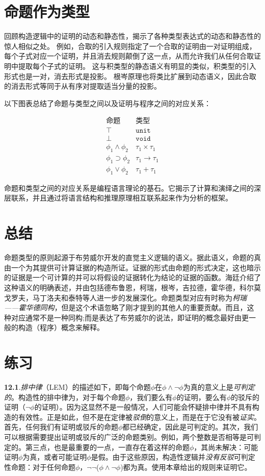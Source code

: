 \section{命题作为类型}

回顾构造逻辑中的证明的动态和静态性，揭示了各种类型表达式的动态和静态性的惊人相似之处。
例如，合取的引入规则指定了一个合取的证明由一对证明组成，每个子式对应一个证明，并且消去规则颠倒了这一点，从而允许我们从任何合取证明中提取每个子式的证明。
这与积类型的静态语义有明显的类似，积类型的引入形式也是一对，消去形式是投影。
根岑原理也将类比扩展到动态语义，因此合取的消去形式等同于从有序对提取适当分量的投影。

以下图表总结了命题与类型之间以及证明与程序之间的对应关系：

$$
\begin{array}{ll}
\text{命题}           & \text{类型}            \\
\top                  & \mathtt{unit}          \\
\bot                  & \mathtt{void}          \\
\phi_1 \land \phi_2   & \tau_1 \times \tau_1   \\
\phi_1 \supset \phi_2 & \tau_1 \to \tau_1      \\
\phi_1 \lor \phi_2    & \tau_1 + \tau_1
\end{array}
$$

命题和类型之间的对应关系是编程语言理论的基石。它揭示了计算和演绎之间的深层联系，并且通过将语言结构和推理原理相互联系起来作为分析的框架。
\section{总结}
命题类型的原则起源于布劳威尔开发的直觉主义逻辑的语义。据此语义，命题的真由一个为其提供可计算证据的构造所证。证据的形式由命题的形式决定，这也暗示的证据是一个可计算的并可以将假设的证据转化为结论的证据的函数。海廷介绍了这种语义的明确表述，并由包括德布鲁恩，柯瑞，根岑，吉拉德，霍华德，科尔莫戈罗夫，马丁洛夫和泰特等人进一步的发展深化。命题类型对应有时称为\textit{柯瑞——霍华德同构}，但是这个术语忽略了刚才提到的其他人的重要贡献。而且，这种对应通常不是一种同构;而是表达了布劳威尔的说法，即证明的概念最好由更一般的构造（程序）概念来解释。

\section*{练习}
\textbf{12.1}.\textit{排中律}（LEM）的描述如下，即每个命题${\phi}$在${\phi \land \lnot\phi}$为真的意义上是\textit{可判定的}。构造性的排中律为，对于每个命题${\phi}$，我们要么有${\phi}$的证明，要么有${\phi}$的驳斥的证明（${\lnot\phi}$的证明）。因为这显然不是一般情况，人们可能会怀疑排中律并不具有构造的有效性。正是如此，但不是在定律被\textit{驳倒}的意义上，而是在于它没有被\textit{证实}。首先，任何我们有证明或驳斥的命题${\phi}$都已经确定，因此是可判定的。其次，我们可以根据需要提出证明或驳斥的广泛的命题类别。例如，两个整数是否相等是可判定的。第三点，也是最重要的一点，一直存在着这样的命题${\phi}$，其尚未解决：可能证明${\phi}$为真，或者可能证明${\phi}$是假。由于这些原因，构造性逻辑并\textit{没有反驳}可判定性命题：对于任何命题${\phi}$，${\lnot\lnot}$(${\phi \land \lnot\phi}$)都为真。使用本章给出的规则来证明它。


